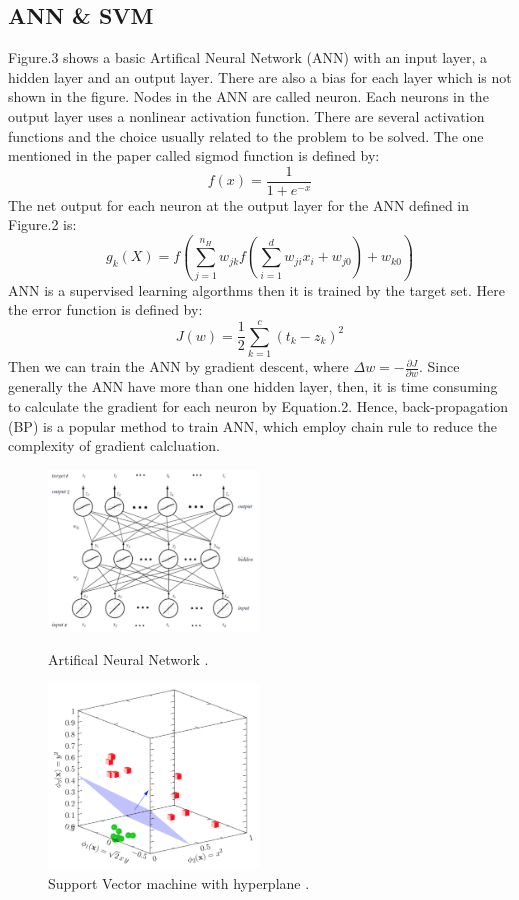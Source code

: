 \documentclass[journal]{IEEEtran}
\begin{document}
\subsection{ANN \& SVM}
Figure.3 shows a basic Artifical Neural Network (ANN) with an input layer, a hidden layer and an output layer. There are also a bias for each layer which is not shown in the figure. Nodes in the ANN are called neuron. Each neurons in the output layer uses a nonlinear activation function. There are several activation functions and the choice usually related to the problem to be solved. The one mentioned in the paper called sigmod function is defined by:
\begin{equation}
  f(x) = \frac{1}{1+e^{-x}}
\end{equation}
The net output for each neuron at the output layer for the ANN defined in Figure.2 is:
\begin{equation}
  g_k(X) = f(\sum_{j=1}^{n_H}w_{jk}f(\sum_{i=1}^dw_{ji}x_i+w_{j0})+w_{k0})
\end{equation}
ANN is a supervised learning algorthms then it is trained by the target set. Here the error function is defined by:
\begin{equation}
  J(w) = \frac{1}{2}\sum_{k=1}^c(t_k-z_k)^2
\end{equation}
Then we can train the ANN by gradient descent, where $\Delta w = -\frac{\partial J}{\partial w}$. Since generally the ANN have more than one hidden layer, then, it is time consuming to calculate the gradient for each neuron by Equation.2. Hence, back-propagation (BP) is a popular method to train ANN, which employ chain rule to reduce the complexity of gradient calcluation.\\
\begin{figure}[H]
  \begin{minipage}[t]{0.5\linewidth}
    \centering
    \includegraphics[width=2.2in]{ANN.png}
    \caption{Artifical Neural Network \cite{kate2017ANN}.}
  \end{minipage}
  \begin{minipage}[t]{0.5\linewidth}
    \centering
    \includegraphics[width=2.2in]{SVM.png}
    \caption{Support Vector machine with hyperplane \cite{adam2017SVM}.}
  \end{minipage}
\end{figure}
\end{document}
